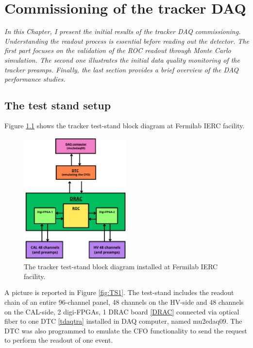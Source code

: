 \chapter{Commissioning of the tracker DAQ}
\textit{In this Chapter, I present the initial results of the tracker DAQ commissioning. 
Understanding the readout process is essential before reading out the detector. 
The first part focuses on the validation of the ROC readout through Monte Carlo simulation. 
The second one illustrates the initial data quality monitoring of the tracker preamps. 
Finally, the last section provides a brief overview of the DAQ performance studies.
}

  \section{The test stand setup}\label{des}
  Figure \ref{fig:blockdiagram} shows the tracker 
  test-stand block diagram at Fermilab IERC facility.
  
  \begin{figure}[!h]
    \centering
    \includegraphics[width =0.5\textwidth]{figures/png/Screenshot_20240712_102528.png}
    \caption{The tracker test-stand block diagram installed at Fermilab IERC facility.}
    \label{fig:blockdiagram}
    \end{figure}



  A picture is reported in Figure \ref{fig:TS1}.
  The test-stand includes the readout chain of an entire 96-channel panel, 
  48 channels on the HV-side and 48 channels on the CAL-side, 2 digi-FPGAs, 
  1 DRAC board \ref{DRAC} connected via optical fiber to one DTC 
  \ref{tdaqtra} installed in DAQ computer, named mu2edaq09. 
  The DTC was also programmed to emulate the CFO functionality to send 
  the request to perform the readout of one event.
    
